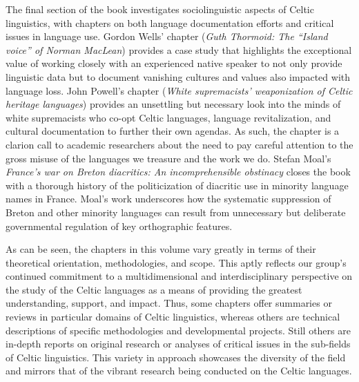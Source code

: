 \documentclass[output=paper]{langscibook}
\begin{document}
The final section of the book investigates sociolinguistic aspects of Celtic linguistics, with chapters on both language documentation efforts and critical issues in language use. Gordon Wells' chapter (\textit{Guth Thormoid: The “Island voice” of Norman MacLean}) provides a case study that highlights the exceptional value of working closely with an experienced native speaker to not only provide linguistic data but to document vanishing cultures and values also impacted with language loss. John Powell’s chapter (\textit{White supremacists’ weaponization of Celtic heritage languages}) provides an unsettling but necessary look into the minds of white supremacists who co-opt Celtic languages, language revitalization, and cultural documentation to further their own agendas. As such, the chapter is a clarion call to academic researchers about the need to pay careful attention to the gross misuse of the languages we treasure and the work we do. Stefan Moal’s \textit{France’s war on Breton diacritics: An incomprehensible obstinacy} closes the book with a thorough history of the politicization of diacritic use in minority language names in France. Moal's work underscores how the systematic suppression of Breton and other minority languages can result from unnecessary but deliberate governmental regulation of key orthographic features. 

As can be seen, the chapters in this volume vary greatly in terms of their theoretical orientation, methodologies, and scope. This aptly reflects our group's continued commitment to a multidimensional and interdisciplinary perspective on the study of the Celtic languages as a means of providing the greatest understanding, support, and impact. Thus, some chapters offer summaries or reviews in particular domains of Celtic linguistics, whereas others are technical descriptions of specific methodologies and developmental projects. Still others are in-depth reports on original research or analyses of critical issues in the sub-fields of Celtic linguistics. This variety in approach showcases the diversity of the field and mirrors that of the vibrant research being conducted on the Celtic languages.

\cleardoublepage
\end{document}
